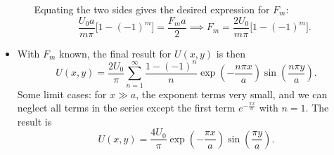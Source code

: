 \documentclass[11pt, a4paper]{article}
\begin{document}
\begin{itemize}
\begin{itemize}
		Equating the two sides gives the desired expression for $ F_{m} $:
		\begin{equation*}
			\frac{U_{0}a}{m \pi}\big[1 - (-1)^{m}\big] = \frac{F_{m}a}{2} \implies F_{m} = \frac{2U_{0}}{m\pi}\big[1 - (-1)^{m}\big].
		\end{equation*}
	\end{itemize}
	
	\item With $ F_{m} $ known, the final result for $ U(x, y) $ is then
	\begin{equation*}
		U(x, y) = \frac{2U_{0}}{\pi} \sum_{n = 1}^{\infty}\frac{1 - (-1)^{n}}{n}\exp(-\frac{n\pi x}{a}) \sin(\frac{n\pi y}{a}).
	\end{equation*}
	Some limit cases: for $ x \gg a $, the exponent terms very small, and we can neglect all terms in the series except the first term $ e^{-\frac{\pi x}{a}} $ with $ n = 1 $. The result is
	\begin{equation*}
		U(x, y) = \frac{4U_{0}}{\pi}\exp(-\frac{\pi x}{a}) \sin (\frac{\pi y}{a}).
	\end{equation*}
	

\end{itemize}
\end{document}
